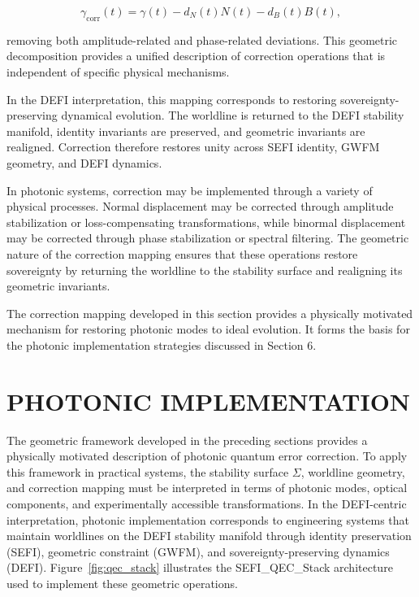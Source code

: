 \documentclass[aip,adv,reprint,floatfix]{revtex4-2}
\begin{document}
\[
\gamma_{\mathrm{corr}}(t) = \gamma(t) - d_{N}(t) N(t) - d_{B}(t) B(t),
\]


removing both amplitude-related and phase-related deviations.\cite{DuttonElectronField2026} This geometric decomposition provides a unified
description of correction operations that is independent
of specific physical mechanisms.

In the DEFI interpretation, this mapping corresponds
to restoring sovereignty-preserving dynamical evolution.\cite{DuttonSEFI2026}
The worldline is returned to the DEFI stability manifold,
identity invariants are preserved, and geometric invariants are realigned. Correction therefore restores unity
across SEFI identity, GWFM geometry, and DEFI dynamics.

In photonic systems, correction may be implemented
through a variety of physical processes.\cite{DuttonElectronField2026}
Normal displacement may be corrected through amplitude stabilization or loss-compensating transformations, while binormal displacement may be corrected through phase stabilization or spectral filtering. The geometric nature of the
correction mapping ensures that these operations restore
sovereignty by returning the worldline to the stability
surface and realigning its geometric invariants.

The correction mapping developed in this section provides a physically motivated mechanism for restoring
photonic modes to ideal evolution. It forms the basis
for the photonic implementation strategies discussed in
Section 6.
\section{PHOTONIC IMPLEMENTATION}

The geometric framework developed in the preceding sections provides a physically motivated description
of photonic quantum error correction.\cite{DuttonSEFI2026,DuttonElectronField2026}
To apply this
framework in practical systems, the stability surface $\Sigma$,
worldline geometry, and correction mapping must be interpreted in terms of photonic modes, optical components, and experimentally accessible transformations. In
the DEFI-centric interpretation, photonic implementation corresponds to engineering systems that maintain
worldlines on the DEFI stability manifold through identity preservation (SEFI), geometric constraint (GWFM),
and sovereignty-preserving dynamics (DEFI). Figure~\ref{fig:qec_stack}
illustrates the SEFI\_QEC\_Stack architecture used to implement
these geometric operations.
\end{document}
